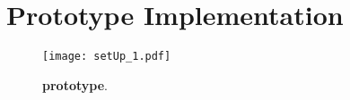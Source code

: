 \section{Prototype Implementation}
\label{sec:prototype}




\begin{figure}[t]
\centering
\texttt{[image: setUp\_1.pdf]}
\caption{\textbf{\name prototype}. }
\label{fig:prototype}
\centering
\end{figure}